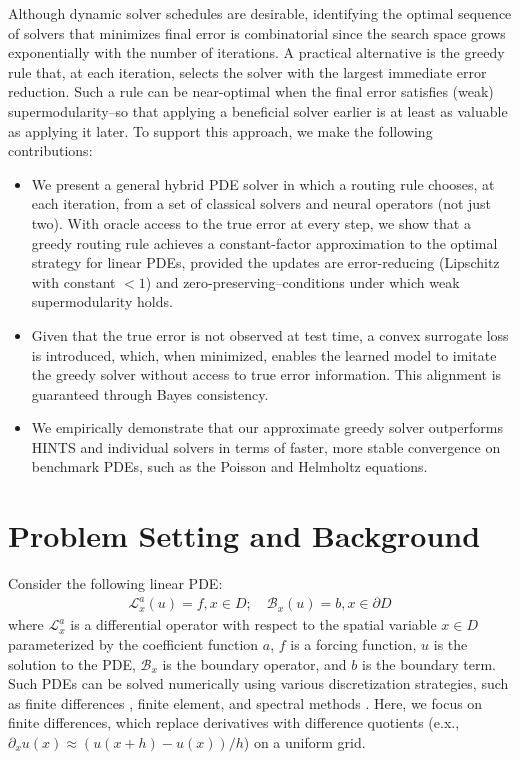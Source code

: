 \documentclass{article} %
\begin{document}
Although dynamic solver schedules are desirable, identifying the optimal sequence of solvers that minimizes final error is combinatorial since the search space grows exponentially with the number of iterations. A practical alternative is the greedy rule that, at each iteration, selects the solver with the largest immediate error reduction.
Such a rule can be near-optimal when the final error satisfies (weak) supermodularity--so that applying a beneficial solver earlier is at least as valuable as applying it later. To support this approach, we make the following contributions:
\begin{itemize}
    \item We present a general hybrid PDE solver in which a routing rule chooses, at each iteration, from a set of classical solvers and neural operators (not just two).  
    With oracle access to the true error at every step, we show that a greedy routing rule
    achieves a constant-factor approximation to the optimal strategy for linear PDEs, provided the updates are error-reducing (Lipschitz with constant $<1$) and zero-preserving--conditions under which weak supermodularity holds.
    \item  Given that the true error is not observed at test time, a convex surrogate loss is introduced, which, when minimized, enables the learned model to imitate the greedy solver without access to true error information. This alignment is guaranteed through Bayes consistency.
    \item We empirically demonstrate that our approximate greedy solver outperforms HINTS and individual solvers in terms of faster, more stable convergence on benchmark PDEs, such as the Poisson and Helmholtz equations.
\end{itemize}


\section{Problem Setting and Background} \label{sec:background}

Consider the following linear PDE:
\begin{equation} \label{eq:mainpde}
    \begin{split}
    \mathcal{L}_{x}^a\left(u\right) = f ,x \in D; \quad
    \mathcal{B}_{x}\left(u\right) = b ,x \in \partial D
    \end{split}
\end{equation}
where $\mathcal{L}_x^a$ is a differential operator with respect to the spatial variable $x \in D$ parameterized by the coefficient function $a$,  $f$ is a forcing function,  $u$ is the solution to the PDE, $\mathcal{B}_{x}$ is the boundary operator, and $b$ is the boundary term. Such PDEs can be solved numerically using various discretization strategies, such as finite differences \citep{smith1985numerical,leveque2007finite}, finite element, and spectral methods \citep{boyd2001chebyshev,canuto2006spectral}. Here, we focus on finite differences, which replace derivatives with difference quotients (e.x., $\partial_x u(x) \approx (u(x + h) - u(x))/h$) on a uniform grid.
\end{document}
